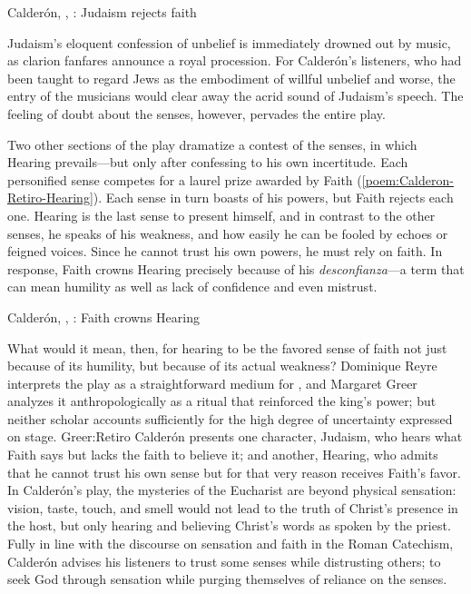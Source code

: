 \begin{poemexample}
    \caption{Calderón, , :
    Judaism rejects faith}

    \label{poem:Calderon-Retiro-Judaismo}

\end{poemexample}

Judaism's eloquent confession of unbelief is immediately drowned out by music,
as clarion fanfares announce a royal procession.
For Calderón's listeners, who had been taught to regard Jews as the embodiment
of willful unbelief and worse, the entry of the musicians would clear away the
acrid sound of Judaism's speech.
The feeling of doubt about the senses, however, pervades the entire play.

Two other sections of the play dramatize a contest of the senses, in which
Hearing prevails---but only after confessing to his own incertitude.
Each personified sense competes for a laurel prize awarded by Faith
(\cref{poem:Calderon-Retiro-Hearing}).
Each sense in turn boasts of his powers, but Faith rejects each one.
Hearing is the last sense to present himself, and in contrast to the other
senses, he speaks of his weakness, and how easily he can be fooled by echoes or
feigned voices.
Since he cannot trust his own powers, he must rely on faith.
In response, Faith crowns Hearing precisely because of his
\emph{desconfianza}---a term that can mean humility as well as lack of
confidence and even mistrust.

\begin{poemexample}
    \caption{Calderón, , : Faith crowns
    Hearing}

    \label{poem:Calderon-Retiro-Hearing}

\end{poemexample}

What would it mean, then, for hearing to be the favored sense of faith not just
because of its humility, but because of its actual weakness?
Dominique Reyre interprets the play as a straightforward medium for
, and Margaret Greer analyzes it anthropologically
as a ritual that reinforced the king's power; but neither scholar accounts
sufficiently for the high degree of uncertainty expressed on stage.%
    \Autocite{Reyre:Retiro}{Greer:Retiro}
Calderón presents one character, Judaism, who hears what Faith says but lacks
the faith to believe it; and another, Hearing, who admits that he cannot trust
his own sense but for that very reason receives Faith's favor.
In Calderón's play, the mysteries of the Eucharist are beyond physical
sensation: vision,
taste, touch, and smell would not lead to the truth of Christ's presence in the
host, but only hearing and believing Christ's words  as
spoken by the priest.
Fully in line with the discourse on sensation and faith in the Roman Catechism,
Calderón advises his listeners to trust some senses while distrusting others; to
seek God through sensation while purging themselves of reliance on the senses.

